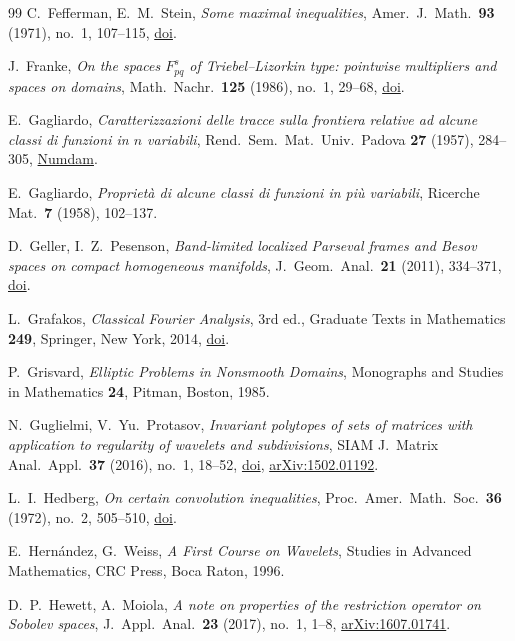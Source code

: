 \begin{thebibliography}{99}
C.~Fefferman, E.~M.~Stein,
\emph{Some maximal inequalities},
Amer.\ J.\ Math.\ \textbf{93} (1971), no.~1, 107--115,
\href{https://doi.org/10.2307/2373450}{doi}.

J.~Franke,
\emph{On the spaces $F^s_{pq}$ of Triebel--Lizorkin type: pointwise multipliers and spaces on
domains},
Math.\ Nachr.\ \textbf{125} (1986), no.~1, 29--68,
\href{https://doi.org/10.1002/mana.19861250104}{doi}.

E.~Gagliardo,
\emph{Caratterizzazioni delle tracce sulla frontiera relative ad alcune classi di funzioni in
$n$ variabili},
Rend.\ Sem.\ Mat.\ Univ.\ Padova \textbf{27} (1957), 284--305,
\href{https://www.numdam.org/item/RSMUP_1957__27__284_0}{Numdam}.

E.~Gagliardo,
\emph{Propriet\`a di alcune classi di funzioni in pi\`u variabili},
Ricerche Mat.\ \textbf{7} (1958), 102--137.

D.~Geller, I.~Z.~Pesenson,
\emph{Band-limited localized Parseval frames and Besov spaces on compact homogeneous
manifolds}, J.~Geom.\ Anal.\ \textbf{21} (2011), 334--371,
\href{https://doi.org/10.1007/s12220-010-9150-3}{doi}.

L.~Grafakos,
\emph{Classical Fourier Analysis}, 3rd ed.,
Graduate Texts in Mathematics \textbf{249}, Springer, New York, 2014,
\href{https://doi.org/10.1007/978-1-4939-1194-3}{doi}.

P.~Grisvard,
\emph{Elliptic Problems in Nonsmooth Domains},
Monographs and Studies in Mathematics \textbf{24}, Pitman, Boston, 1985.

N.~Guglielmi, V.~Yu.~Protasov,
\emph{Invariant polytopes of sets of matrices with application to regularity of wavelets and
subdivisions},
SIAM J.\ Matrix Anal.\ Appl.\ \textbf{37} (2016), no.~1, 18--52,
\href{https://doi.org/10.1137/15M1006945}{doi},
\href{https://arxiv.org/abs/1502.01192}{arXiv:1502.01192}.

L.~I.~Hedberg,
\emph{On certain convolution inequalities},
Proc.\ Amer.\ Math.\ Soc.\ \textbf{36} (1972), no.~2, 505--510,
\href{https://doi.org/10.1090/S0002-9939-1972-0312232-4}{doi}.

E.~Hern\'andez, G.~Weiss,
\emph{A First Course on Wavelets},
Studies in Advanced Mathematics, CRC Press, Boca Raton, 1996.

D.~P.~Hewett, A.~Moiola,
\emph{A note on properties of the restriction operator on Sobolev spaces},
J.\ Appl.\ Anal.\ \textbf{23} (2017), no.~1, 1--8,
\href{https://arxiv.org/abs/1607.01741}{arXiv:1607.01741}.


\end{thebibliography}
